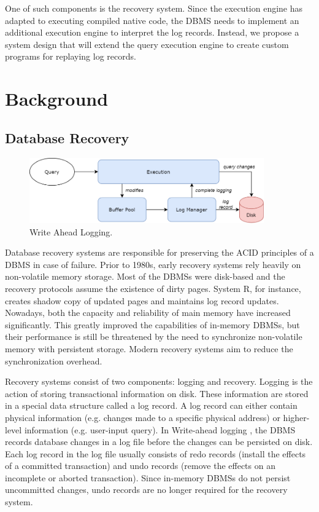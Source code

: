 \documentclass[12pt]{cmuthesis}
\begin{document}
One of such components is the recovery system. Since the execution engine has adapted to executing compiled native code, the DBMS needs to implement an additional execution engine to interpret the log records. Instead, we propose a system design that will extend the query execution engine to create custom programs for replaying log records.

\chapter{Background}
\section{Database Recovery}
\begin{figure}[H]
\centering
\includegraphics[width=0.9\textwidth]{images/Logging.png}
\caption{Write Ahead Logging.}
\label{fig:logging}
\end{figure}
Database recovery systems are responsible for preserving the ACID principles of a DBMS in case of failure. Prior to 1980s, early recovery systems rely heavily on non-volatile memory storage. Most of the DBMSs were disk-based and the recovery protocols assume the existence of dirty pages. System R\cite{system_r}, for instance, creates shadow copy of updated pages and maintains log record updates. Nowadays, both the capacity and reliability of main memory have increased significantly. This greatly improved the capabilities of in-memory DBMSs, but their performance is still be threatened by the need to synchronize non-volatile memory with persistent storage. Modern recovery systems aim to reduce the synchronization overhead.

Recovery systems consist of two components: logging and recovery. Logging is the action of storing transactional information on disk. These information are stored in a special data structure called a log record. A log record can either contain physical information (e.g. changes made to a specific physical address) or higher-level information (e.g. user-input query). In Write-ahead logging \cite{aries}, the DBMS records database changes in a log file before the changes can be persisted on disk. Each log record in the log file usually consists of redo records (install the effects of a committed transaction) and undo records (remove the effects on an incomplete or aborted transaction). Since in-memory DBMSs do not persist uncommitted changes, undo records are no longer required for the recovery system.
\end{document}
